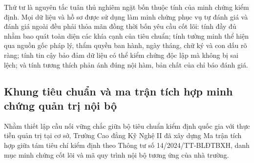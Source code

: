 Thứ tư là nguyên tắc tuân thủ nghiêm ngặt bốn thuộc tính của minh chứng kiểm định. Mọi dữ liệu và hồ sơ được sử dụng làm minh chứng phục vụ tự đánh giá và đánh giá ngoài đều phải thỏa mãn đồng thời bốn yêu cầu cốt lõi: tính đầy đủ nhằm bao quát toàn diện các khía cạnh của tiêu chuẩn; tính tường minh thể hiện qua nguồn gốc pháp lý, thẩm quyền ban hành, ngày tháng, chữ ký và con dấu rõ ràng; tính tin cậy bảo đảm dữ liệu có thể kiểm chứng độc lập mà không bị sai lệch; và tính tương thích phản ánh đúng nội hàm, bản chất của chỉ báo đánh giá.

\subsection{Khung tiêu chuẩn và ma trận tích hợp minh chứng quản trị nội bộ}

Nhằm thiết lập cầu nối vững chắc giữa bộ tiêu chuẩn kiểm định quốc gia với thực tiễn quản trị tại cơ sở, Trường Cao đẳng Kỹ Nghệ II đã xây dựng Ma trận tích hợp giữa tám tiêu chí kiểm định theo Thông tư số 14/2024/TT-BLĐTBXH, danh mục minh chứng cốt lõi và mã quy trình nội bộ tương ứng của nhà trường.

